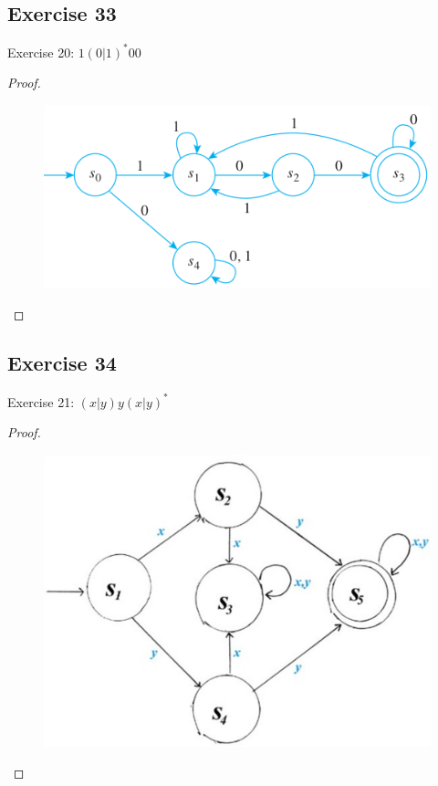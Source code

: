\documentclass[14pt]{extarticle}
\begin{document}
\subsection{Exercise 33}
Exercise 20: \(1(0 | 1)^* 00\)
\begin{proof}
    \begin{figure}[ht!]
        \centering
        \includegraphics[scale=0.5]{../images/12.2.33.png}
    \end{figure}
\end{proof}

\subsection{Exercise 34}
Exercise 21: \((x | y)y(x | y)^*\)
\begin{proof}
    \begin{figure}[ht!]
        \centering
        \includegraphics[scale=0.2]{../images/12.2.34.png}
    \end{figure}
\end{proof}
\end{document}
